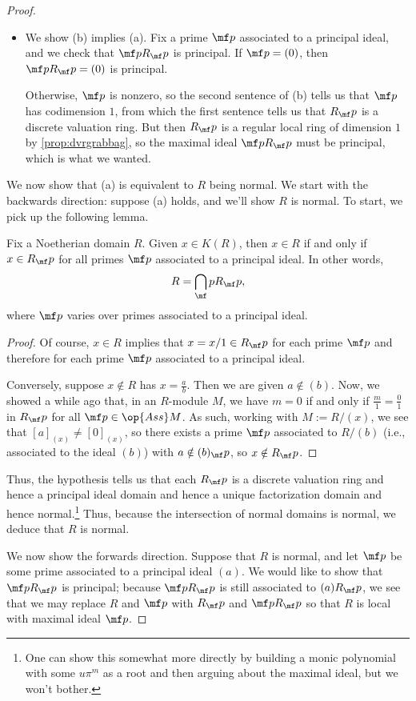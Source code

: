 \begin{proof}
\begin{itemize}
		\item We show (b) implies (a). Fix a prime $\mf p$ associated to a principal ideal, and we check that $\mf pR_\mf p$ is principal. If $\mf p=(0)$, then $\mf pR_\mf p=(0)$ is principal.

		Otherwise, $\mf p$ is nonzero, so the second sentence of (b) tells us that $\mf p$ has codimension $1$, from which the first sentence tells us that $R_\mf p$ is a discrete valuation ring. But then $R_\mf p$ is a regular local ring of dimension $1$ by \autoref{prop:dvrgrabbag}, so the maximal ideal $\mf pR_\mf p$ must be principal, which is what we wanted.
	\end{itemize}
	We now show that (a) is equivalent to $R$ being normal. We start with the backwards direction: suppose (a) holds, and we'll show $R$ is normal. To start, we pick up the following lemma.
	\begin{lemma}
		Fix a Noetherian domain $R$. Given $x\in K(R)$, then $x\in R$ if and only if $x\in R_\mf p$ for all primes $\mf p$ associated to a principal ideal. In other words,
		\[R=\bigcap_\mf pR_\mf p,\]
		where $\mf p$ varies over primes associated to a principal ideal.
	\end{lemma}
	\begin{proof}
		Of course, $x\in R$ implies that $x=x/1\in R_\mf p$ for each prime $\mf p$ and therefore for each prime $\mf p$ associated to a principal ideal.

		Conversely, suppose $x\notin R$ has $x=\frac ab$. Then we are given $a\notin(b)$. Now, we showed a while ago that, in an $R$-module $M$, we have $m=0$ if and only if $\frac m1=\frac01$ in $R_\mf p$ for all $\mf p\in\op{Ass}M$. As such, working with $M:=R/(x)$, we see that $[a]_{(x)}\ne[0]_{(x)}$, so there exists a prime $\mf p$ associated to $R/(b)$ (i.e., associated to the ideal $(b)$) with $a\notin(b)_\mf p$, so $x\notin R_\mf p$.
	\end{proof}
	Thus, the hypothesis tells us that each $R_\mf p$ is a discrete valuation ring and hence a principal ideal domain and hence a unique factorization domain and hence normal.\footnote{One can show this somewhat more directly by building a monic polynomial with some $u\pi^m$ as a root and then arguing about the maximal ideal, but we won't bother.} Thus, because the intersection of normal domains is normal, we deduce that $R$ is normal.

	We now show the forwards direction. Suppose that $R$ is normal, and let $\mf p$ be some prime associated to a principal ideal $(a)$. We would like to show that $\mf pR_\mf p$ is principal; because $\mf pR_\mf p$ is still associated to $(a)R_\mf p$, we see that we may replace $R$ and $\mf p$ with $R_\mf p$ and $\mf pR_\mf p$ so that $R$ is local with maximal ideal $\mf p$.


\end{proof}
